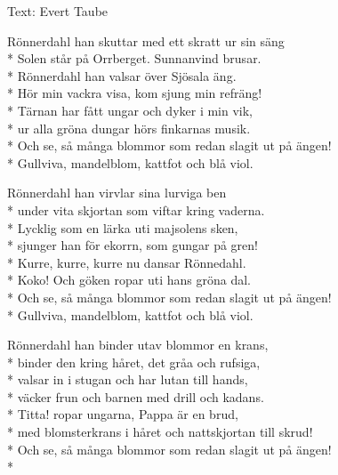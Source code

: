 \begin{SongText}
    \begin{SongInfo}
        Text: Evert Taube
    \end{SongInfo}
    \begin{SongVerse}
        Rönnerdahl han skuttar med ett skratt ur sin säng\\*%
        Solen står på Orrberget. Sunnanvind brusar.\\*%
        Rönnerdahl han valsar över Sjösala äng.\\*%
        Hör min vackra visa, kom sjung min refräng!\\*%
        Tärnan har fått ungar och dyker i min vik,\\*%
        ur alla gröna dungar hörs finkarnas musik.\\*%
        Och se, så många blommor som redan slagit ut på ängen!\\*%
        Gullviva, mandelblom, kattfot och blå viol.
    \end{SongVerse}
    \begin{SongVerse}
        Rönnerdahl han virvlar sina lurviga ben\\*%
        under vita skjortan som viftar kring vaderna.\\*%
        Lycklig som en lärka uti majsolens sken,\\*%
        sjunger han för ekorrn, som gungar på gren!\\*%
        Kurre, kurre, kurre nu dansar Rönnedahl.\\*%
        Koko! Och göken ropar uti hans gröna dal.\\*%
        Och se, så många blommor som redan slagit ut på ängen!\\*%
        Gullviva, mandelblom, kattfot och blå viol. 
    \end{SongVerse}
    \begin{SongVerse}
        Rönnerdahl han binder utav blommor en krans,\\*%
        binder den kring håret, det gråa och rufsiga,\\*%
        valsar in i stugan och har lutan till hands,\\*%
        väcker frun och barnen med drill och kadans.\\*%
        Titta! ropar ungarna, Pappa är en brud,\\*%
        med blomsterkrans i håret och nattskjortan till skrud!\\*%
        Och se, så många blommor som redan slagit ut på ängen!\\*%

\end{SongVerse}
\end{SongText}
